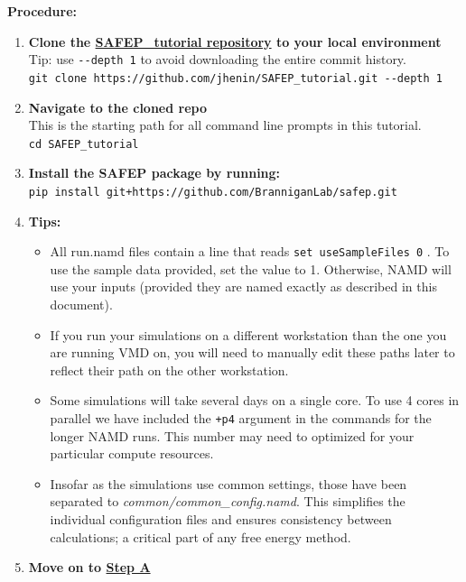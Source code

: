 \documentclass[9pt,tutorial]{Styling/livecoms}
\newcommand{\filepath}[1]{\textit{#1}}
\newcommand{\textInput}[1]{
  \texttt{#1}
}
\begin{document}
\textbf{Procedure:}
\begin{enumerate}
    \item \textbf{Clone the \href{https://github.com/jhenin/SAFEP_tutorial}{SAFEP\_tutorial repository} to your local environment} Tip: use \textInput{-{}-depth 1} to avoid downloading the entire commit history. \\
    \textInput{git clone https://github.com/jhenin/SAFEP\_tutorial.git -{}-depth 1}
    \item \textbf{Navigate to the cloned repo}\\
    This is the starting path for all command line prompts in this tutorial. \\
    \textInput{cd SAFEP\_tutorial}
    \item \textbf{Install the SAFEP package by running:}\\
    \textInput{pip install git+https://github.com/BranniganLab/safep.git}
    \item \textbf{Tips:} 
    \begin{itemize}
    \item All run.namd files contain a line that reads \textInput{set useSampleFiles 0}. To use the sample data provided, set the value to 1. Otherwise, NAMD will use your inputs (provided they are named exactly as described in this document).
    \item If you run your simulations on a different workstation than the one you are running VMD on, you will need to manually edit these paths later to reflect their path on the other workstation.
    \item Some simulations will take several days on a single core. To use 4 cores in parallel we have included the \textInput{+p4} argument in the commands for the longer NAMD runs. This number may need to optimized for your particular compute resources.
    \item Insofar as the simulations use common settings, those have been separated to \filepath{common/common\_config.namd}. This simplifies the individual configuration files and ensures consistency between calculations; a critical part of any free energy method.
    \end{itemize}
    \item \textbf{Move on to \hyperref[step:equilibrium]{Step A}}
\end{enumerate}

\renewcommand\thesubsection{Step \Alph{subsection}:}
\end{document}
